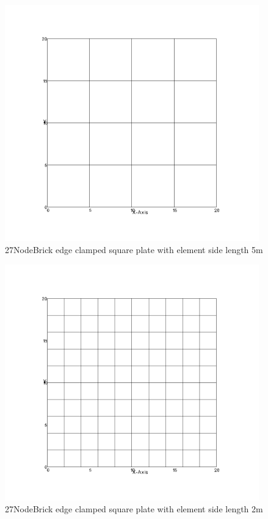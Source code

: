 \documentclass[fleqn,11pt,letter]{article}
\begin{document}
\newpage

\begin{figure}[H]
  \centering
  \includegraphics[width=11cm]{../Figure_files/27NodeBrick/square_plate2.png}
  \caption{27NodeBrick edge clamped square plate with element side length 5m }
  \label{fig 27NodeBrick edges clamped square plate with element side length 5m }
\end{figure}


\begin{figure}[H]
  \centering
  \includegraphics[width=11cm]{../Figure_files/27NodeBrick/square_plate3.png}
  \caption{27NodeBrick edge clamped square plate with element side length 2m }
  \label{fig 27NodeBrick edges clamped square plate with element side length 2m }
\end{figure}
\end{document}
